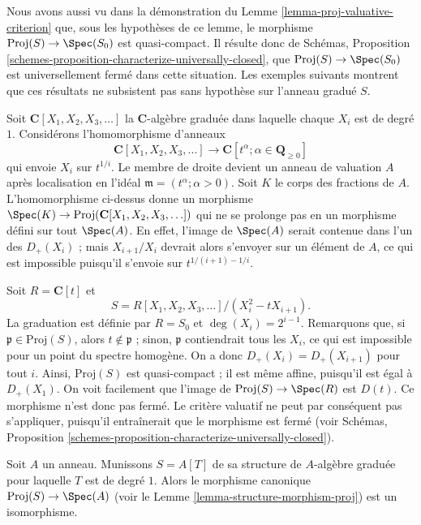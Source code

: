 \noindent
Nous avons aussi vu dans la démonstration du
Lemme \ref{lemma-proj-valuative-criterion} que, sous les hypothèses de ce
lemme, le morphisme $\text{Proj}(S) \to \Spec(S_0)$ est quasi-compact.
Il résulte donc de Schémas,
Proposition \ref{schemes-proposition-characterize-universally-closed}, que
$\text{Proj}(S) \to \Spec(S_0)$ est universellement fermé dans cette
situation. Les exemples suivants montrent que ces résultats ne subsistent
pas sans hypothèse sur l'anneau gradué $S$.

\begin{example}
\label{example-not-existence-valuative-big-proj}
Soit $\mathbf{C}[X_1, X_2, X_3, \ldots]$ la $\mathbf{C}$-algèbre graduée dans
laquelle chaque $X_i$ est de degré $1$. Considérons l'homomorphisme d'anneaux
$$
\mathbf{C}[X_1, X_2, X_3, \ldots]
\longrightarrow
\mathbf{C}[t^\alpha ; \alpha \in \mathbf{Q}_{\geq 0}]
$$
qui envoie $X_i$ sur $t^{1/i}$. Le membre de droite devient un anneau de
valuation $A$ après localisation en l'idéal
$\mathfrak m = (t^\alpha ; \alpha > 0)$. Soit $K$ le corps des fractions de
$A$. L'homomorphisme ci-dessus donne un morphisme
$\Spec(K) \to \text{Proj}(\mathbf{C}[X_1, X_2, X_3, \ldots])$ qui ne se
prolonge pas en un morphisme défini sur tout $\Spec(A)$. En effet, l'image de
$\Spec(A)$ serait contenue dans l'un des $D_{+}(X_i)$ ; mais
$X_{i + 1}/X_i$ devrait alors s'envoyer sur un élément de $A$, ce qui est
impossible puisqu'il s'envoie sur $t^{1/(i + 1) - 1/i}$.
\end{example}

\begin{example}
\label{example-not-existence-valuative-small-proj}
Soit $R = \mathbf{C}[t]$ et
$$
S = R[X_1, X_2, X_3, \ldots]/(X_i^2 - tX_{i + 1}).
$$
La graduation est définie par $R = S_0$ et
$\deg(X_i) = 2^{i - 1}$. Remarquons que, si
$\mathfrak p \in \text{Proj}(S)$, alors $t \not \in \mathfrak p$ ; sinon,
$\mathfrak p$ contiendrait tous les $X_i$, ce qui est impossible pour un point
du spectre homogène. On a donc
$D_{+}(X_i) = D_{+}(X_{i + 1})$ pour tout $i$. Ainsi,
$\text{Proj}(S)$ est quasi-compact ; il est même affine, puisqu'il est égal à
$D_{+}(X_1)$. On voit facilement que l'image de
$\text{Proj}(S) \to \Spec(R)$ est $D(t)$. Ce morphisme n'est donc pas fermé.
Le critère valuatif ne peut par conséquent pas s'appliquer, puisqu'il
entraînerait que le morphisme est fermé (voir Schémas,
Proposition \ref{schemes-proposition-characterize-universally-closed}).
\end{example}

\begin{example}
\label{example-trivial-proj}
Soit $A$ un anneau. Munissons $S = A[T]$ de sa structure de $A$-algèbre
graduée pour laquelle $T$ est de degré $1$. Alors le morphisme canonique
$\text{Proj}(S) \to \Spec(A)$ (voir le
Lemme \ref{lemma-structure-morphism-proj}) est un isomorphisme.
\end{example}

